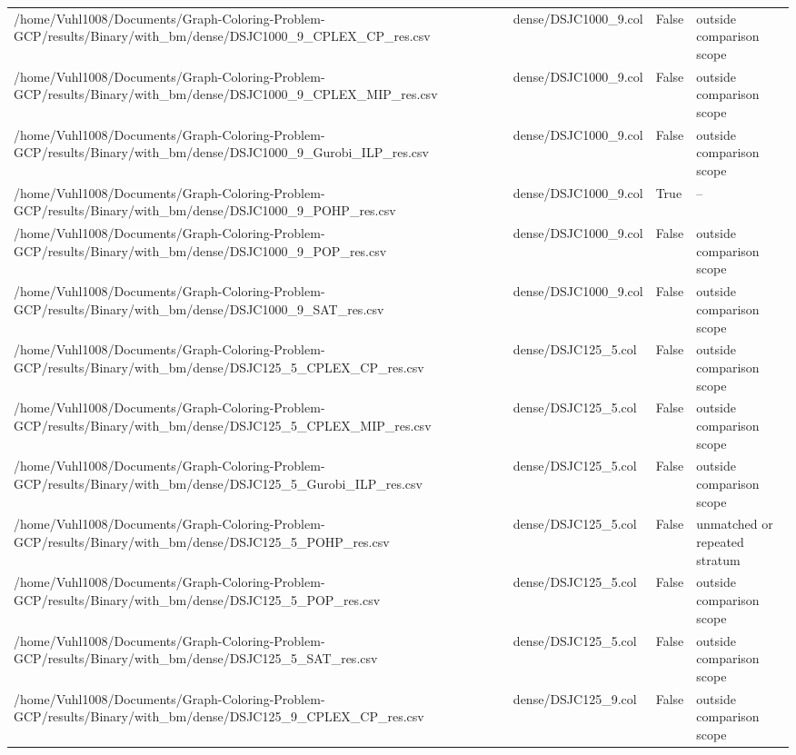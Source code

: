 \begin{table}[htbp]
\begin{tabular}{llll}
/home/Vuhl1008/Documents/Graph-Coloring-Problem-GCP/results/Binary/with\_bm/dense/DSJC1000\_9\_CPLEX\_CP\_res.csv & dense/DSJC1000\_9.col & False & outside comparison scope \\
/home/Vuhl1008/Documents/Graph-Coloring-Problem-GCP/results/Binary/with\_bm/dense/DSJC1000\_9\_CPLEX\_MIP\_res.csv & dense/DSJC1000\_9.col & False & outside comparison scope \\
/home/Vuhl1008/Documents/Graph-Coloring-Problem-GCP/results/Binary/with\_bm/dense/DSJC1000\_9\_Gurobi\_ILP\_res.csv & dense/DSJC1000\_9.col & False & outside comparison scope \\
/home/Vuhl1008/Documents/Graph-Coloring-Problem-GCP/results/Binary/with\_bm/dense/DSJC1000\_9\_POHP\_res.csv & dense/DSJC1000\_9.col & True & -- \\
/home/Vuhl1008/Documents/Graph-Coloring-Problem-GCP/results/Binary/with\_bm/dense/DSJC1000\_9\_POP\_res.csv & dense/DSJC1000\_9.col & False & outside comparison scope \\
/home/Vuhl1008/Documents/Graph-Coloring-Problem-GCP/results/Binary/with\_bm/dense/DSJC1000\_9\_SAT\_res.csv & dense/DSJC1000\_9.col & False & outside comparison scope \\
/home/Vuhl1008/Documents/Graph-Coloring-Problem-GCP/results/Binary/with\_bm/dense/DSJC125\_5\_CPLEX\_CP\_res.csv & dense/DSJC125\_5.col & False & outside comparison scope \\
/home/Vuhl1008/Documents/Graph-Coloring-Problem-GCP/results/Binary/with\_bm/dense/DSJC125\_5\_CPLEX\_MIP\_res.csv & dense/DSJC125\_5.col & False & outside comparison scope \\
/home/Vuhl1008/Documents/Graph-Coloring-Problem-GCP/results/Binary/with\_bm/dense/DSJC125\_5\_Gurobi\_ILP\_res.csv & dense/DSJC125\_5.col & False & outside comparison scope \\
/home/Vuhl1008/Documents/Graph-Coloring-Problem-GCP/results/Binary/with\_bm/dense/DSJC125\_5\_POHP\_res.csv & dense/DSJC125\_5.col & False & unmatched or repeated stratum \\
/home/Vuhl1008/Documents/Graph-Coloring-Problem-GCP/results/Binary/with\_bm/dense/DSJC125\_5\_POP\_res.csv & dense/DSJC125\_5.col & False & outside comparison scope \\
/home/Vuhl1008/Documents/Graph-Coloring-Problem-GCP/results/Binary/with\_bm/dense/DSJC125\_5\_SAT\_res.csv & dense/DSJC125\_5.col & False & outside comparison scope \\
/home/Vuhl1008/Documents/Graph-Coloring-Problem-GCP/results/Binary/with\_bm/dense/DSJC125\_9\_CPLEX\_CP\_res.csv & dense/DSJC125\_9.col & False & outside comparison scope \\

\end{tabular}
\end{table}
